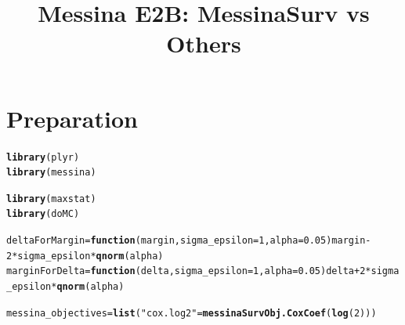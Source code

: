 \documentclass{article}\usepackage[]{graphicx}\usepackage[]{color}
\makeatletter
\newcommand{\hlnum}[1]{\textcolor[rgb]{0.686,0.059,0.569}{#1}}%
\newcommand{\hlstr}[1]{\textcolor[rgb]{0.192,0.494,0.8}{#1}}%
\newcommand{\hlopt}[1]{\textcolor[rgb]{0,0,0}{#1}}%
\newcommand{\hlstd}[1]{\textcolor[rgb]{0.345,0.345,0.345}{#1}}%
\newcommand{\hlkwa}[1]{\textcolor[rgb]{0.161,0.373,0.58}{\textbf{#1}}}%
\newcommand{\hlkwb}[1]{\textcolor[rgb]{0.69,0.353,0.396}{#1}}%
\newcommand{\hlkwc}[1]{\textcolor[rgb]{0.333,0.667,0.333}{#1}}%
\newcommand{\hlkwd}[1]{\textcolor[rgb]{0.737,0.353,0.396}{\textbf{#1}}}%
\newenvironment{kframe}{%
 \def\at@end@of@kframe{}%
 \ifinner\ifhmode%
  \def\at@end@of@kframe{\end{minipage}}%
  \begin{minipage}{\columnwidth}%
 \fi\fi%
 \def\FrameCommand##1{\hskip\@totalleftmargin \hskip-\fboxsep
 \colorbox{shadecolor}{##1}\hskip-\fboxsep
     \hskip-\linewidth \hskip-\@totalleftmargin \hskip\columnwidth}%
 \MakeFramed {\advance\hsize-\width
   \@totalleftmargin\z@ \linewidth\hsize
   \@setminipage}}%
 {\par\unskip\endMakeFramed%
 \at@end@of@kframe}
\newenvironment{knitrout}{}{} %
\makeatother
\begin{document}
\title{Messina E2B: MessinaSurv vs Others}
\maketitle


\section{Preparation}
\begin{knitrout}
\color{fgcolor}\begin{kframe}
\begin{alltt}
\hlkwd{library}\hlstd{(plyr)}
\hlkwd{library}\hlstd{(messina)}
\end{alltt}


{\ttfamily\noindent\itshape\color{messagecolor}{\#\# Loading required package: survival\\\#\# Loading required package: splines\\\#\# Loading required package: methods}}\begin{alltt}
\hlkwd{library}\hlstd{(maxstat)}
\hlkwd{library}\hlstd{(doMC)}
\end{alltt}


{\ttfamily\noindent\itshape\color{messagecolor}{\#\# Loading required package: foreach\\\#\# Loading required package: iterators\\\#\# Loading required package: parallel}}\begin{alltt}
\hlstd{deltaForMargin} \hlkwb{=} \hlkwa{function}\hlstd{(}\hlkwc{margin}\hlstd{,} \hlkwc{sigma_epsilon} \hlstd{=} \hlnum{1}\hlstd{,} \hlkwc{alpha} \hlstd{=} \hlnum{0.05}\hlstd{) margin} \hlopt{-} \hlnum{2}\hlopt{*}\hlstd{sigma_epsilon}\hlopt{*}\hlkwd{qnorm}\hlstd{(alpha)}
\hlstd{marginForDelta} \hlkwb{=} \hlkwa{function}\hlstd{(}\hlkwc{delta}\hlstd{,} \hlkwc{sigma_epsilon} \hlstd{=} \hlnum{1}\hlstd{,} \hlkwc{alpha} \hlstd{=} \hlnum{0.05}\hlstd{) delta} \hlopt{+} \hlnum{2}\hlopt{*}\hlstd{sigma_epsilon}\hlopt{*}\hlkwd{qnorm}\hlstd{(alpha)}

\hlstd{messina_objectives} \hlkwb{=} \hlkwd{list}\hlstd{(}\hlstr{"cox.log2"} \hlstd{=} \hlkwd{messinaSurvObj.CoxCoef}\hlstd{(}\hlkwd{log}\hlstd{(}\hlnum{2}\hlstd{)))}


\end{alltt}
\end{kframe}
\end{knitrout}
\end{document}
